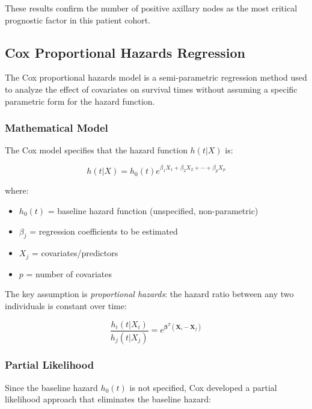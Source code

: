 \documentclass[12pt,a4paper]{article}
\begin{document}
These results confirm the number of positive axillary nodes as the most critical prognostic factor in this patient cohort.

\subsection{Cox Proportional Hazards Regression}

The Cox proportional hazards model is a semi-parametric regression method used to analyze the effect of covariates on survival times without assuming a specific parametric form for the hazard function.

\subsubsection{Mathematical Model}

The Cox model specifies that the hazard function \(h(t|X)\) is:

\begin{equation}
h(t|X) = h_0(t) e^{\beta_1 X_1 + \beta_2 X_2 + \cdots + \beta_p X_p}
\label{eq:cox_model}
\end{equation}

where:
\begin{itemize}
    \item \(h_0(t)\) = baseline hazard function (unspecified, non-parametric)
    \item \(\beta_j\) = regression coefficients to be estimated
    \item \(X_j\) = covariates/predictors
    \item \(p\) = number of covariates
\end{itemize}

The key assumption is \textit{proportional hazards}: the hazard ratio between any two individuals is constant over time:

\begin{equation}
\frac{h_i(t|X_i)}{h_j(t|X_j)} = e^{\boldsymbol{\beta}^T(\mathbf{X}_i - \mathbf{X}_j)}
\label{eq:proportional_hazards}
\end{equation}

\subsubsection{Partial Likelihood}

Since the baseline hazard \(h_0(t)\) is not specified, Cox developed a partial likelihood approach that eliminates the baseline hazard:
\end{document}
